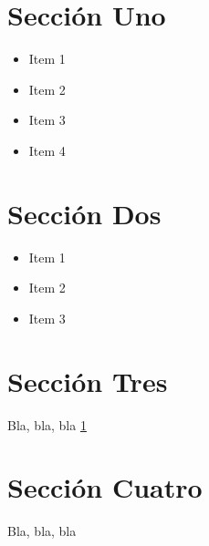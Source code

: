 
\section{Sección Uno}
\label{1:sec:1}

\begin{itemize}
  \item Item 1 \cite{Bay1}
  \item Item 2
  \item Item 3
  \item Item 4
\end{itemize}

\section{Sección Dos}
\label{1:sec:2}

\begin{itemize}
  \item Item 1
  \item Item 2
  \item Item 3
\end{itemize}

\section{Sección Tres}
\label{1:sec:3}

Bla, bla, bla  \ref{1:sec:1}

\section{Sección Cuatro}
\label{1:sec:4}

Bla, bla, bla

